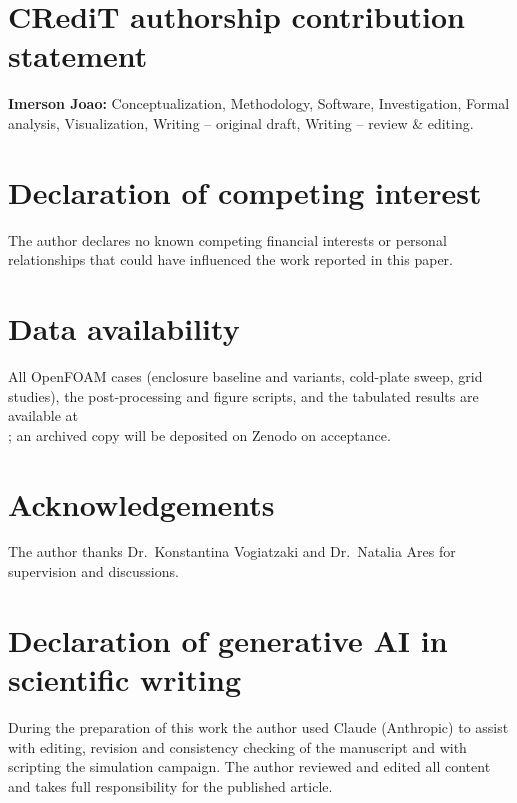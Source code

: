 \documentclass[preprint,12pt]{elsarticle}
\begin{document}
\section*{CRediT authorship contribution statement}
\textbf{Imerson Joao:} Conceptualization, Methodology, Software, Investigation, Formal
analysis, Visualization, Writing -- original draft, Writing -- review \& editing.

\section*{Declaration of competing interest}
The author declares no known competing financial interests or personal relationships that
could have influenced the work reported in this paper.

\section*{Data availability}
All OpenFOAM cases (enclosure baseline and variants, cold-plate sweep, grid studies), the
post-processing and figure scripts, and the tabulated results are available at
\\ ; an archived copy will be deposited on Zenodo on acceptance.

\section*{Acknowledgements}
The author thanks Dr.\ Konstantina Vogiatzaki and Dr.\ Natalia Ares for supervision and
discussions.

\section*{Declaration of generative AI in scientific writing}
During the preparation of this work the author used Claude (Anthropic) to assist with
editing, revision and consistency checking of the manuscript and with scripting the
simulation campaign. The author reviewed and edited all content and takes full
responsibility for the published article.



\end{document}
